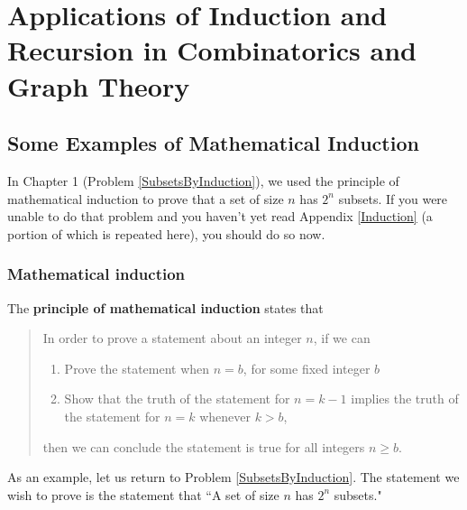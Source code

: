 \chapter{Applications of Induction and Recursion in Combinatorics and
Graph Theory}
\label{InductionRecursion}
\section{Some Examples of Mathematical Induction}
 In Chapter 1 (Problem
\ref{SubsetsByInduction}), we used the principle of mathematical
induction to prove that a set of size $n$ has
$2^n$ subsets.  If you were unable to do that problem and you haven't yet
read Appendix \ref{Induction} (a portion of which is repeated here), you
should do so now.
\subsection{Mathematical induction}  The {\bf principle of mathematical
induction}
states that
\begin{quote}
In order to prove a statement about an integer $n$, if we
can\begin{enumerate}
\item Prove the statement when $n=b$, for some fixed integer $b$
\item Show that the truth of the statement for $n=k-1$ implies the truth
of the statement for $n=k$ whenever $k>b$,
\end{enumerate}
then we can conclude the statement is true for all integers $n\ge
b$.\end{quote} As an example, let us return to Problem
\ref{SubsetsByInduction}.  The statement we wish to prove is the
statement that ``A set of size $n$ has $2^n$ subsets."  

